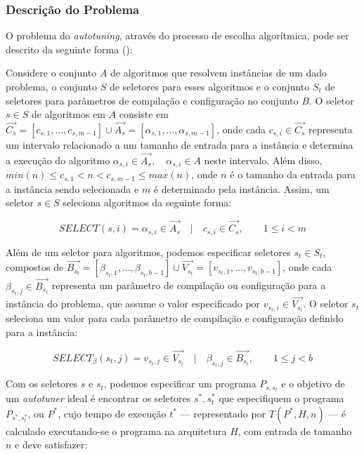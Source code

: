 \documentclass[a4paper, 12pt]{article}
\begin{document}
\subsubsection{Descrição do Problema}

O problema do \emph{autotuning}, através do processo de escolha algorítmica,
pode ser descrito da seguinte forma (\citet{ansel2011efficient}):

Considere o conjunto $A$ de algoritmos que resolvem instâncias de um dado 
problema, o conjunto $S$ de seletores para esses algoritmos e o conjunto $S_t$
de seletores para parâmetros de compilação e configuração no conjunto $B$.
O seletor $s \in S$ de algoritmos em $A$ consiste em 
$\overrightarrow{C_s} = [c_{s,1},\dots,c_{s,m-1}] \cup \overrightarrow{A_s} = 
[\alpha_{s,1},\dots,\alpha_{s,m-1}]$,
onde cada $c_{s,i} \in \overrightarrow{C_s}$ representa um intervalo 
relacionado a um tamanho de entrada para a instância e 
determina a execução do algoritmo $\alpha_{s,i} \in \overrightarrow{A_s}, 
\quad \alpha_{s,i} \in A$ neste intervalo. 
Além disso, $min(n) \leq c_{s,1} < n < c_{s,m-1} \leq max(n)$,
onde $n$ é o tamanho da entrada para a instância sendo selecionada e $m$ 
é determinado pela instância.
Assim, um seletor $s \in S$ seleciona algoritmos da seguinte forma:

\begin{equation*}
    SELECT(s, i) = \alpha_{s,i} \in \overrightarrow{A_{s}} \quad | \quad c_{s,i} \in \overrightarrow{C_{s}},
    \quad\quad 1 \leq i < m
\end{equation*}

Além de um seletor para algoritmos, podemos especificar seletores $s_t \in S_t$,
compostos de $\overrightarrow{B_{s_t}} = [\beta_{s_t,1},\dots,\beta_{s_t,b-1}] 
\cup \overrightarrow{V_{s_t}} = [v_{s_t,1},\dots,v_{s_t,b-1}]$,
onde cada $\beta_{s_t,j} \in \overrightarrow{B_{s_t}}$ representa um parâmetro
de compilação ou configuração para a instância do problema, que assume o valor
especificado por $v_{s_t,i} \in \overrightarrow{V_{s_t}}$.
O seletor $s_t$ seleciona um valor para cada parâmetro de compilação e 
configuração definido para a instância:

\begin{equation*}
    SELECT_{\beta}(s_t, j) = v_{s_t,j} \in \overrightarrow{V_{s_t}} \quad | \quad \beta_{s_t,j} \in \overrightarrow{B_{s_t}},
    \quad\quad 1 \leq j < b
\end{equation*}

Com os seletores $s$ e $s_t$, podemos especificar um programa
$P_{s,s_t}$ e o objetivo de um \emph{autotuner} ideal é encontrar
os seletores $s^*,s_{t}^{*}$ que especifiquem o programa $P_{s^*,s_{t}^{*}}$, 
ou $P^*$, cujo tempo de execução $t^*$ --- representado por $T(P^*,H,n)$ --- 
é calculado executando-se o programa na arquitetura $H$, com entrada de tamanho
$n$ e deve satisfazer:
\end{document}
